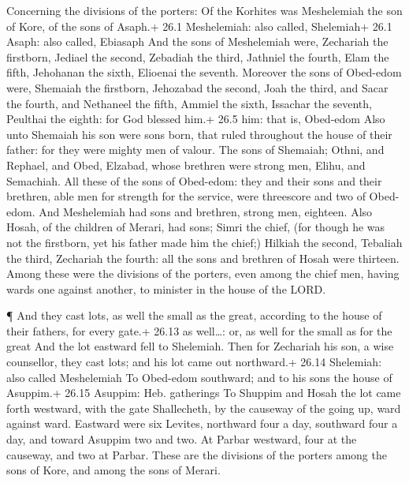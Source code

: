  Concerning the divisions of the porters: Of the Korhites
was Meshelemiah the son of Kore, of the sons of Asaph.+ 26.1
Meshelemiah: also called, Shelemiah+ 26.1 Asaph: also called, Ebiasaph
 And the sons of Meshelemiah were, Zechariah the firstborn,
Jediael the second, Zebadiah the third, Jathniel the fourth,
 Elam the fifth, Jehohanan the sixth, Elioenai the seventh.
 Moreover the sons of Obed-edom were, Shemaiah the
firstborn, Jehozabad the second, Joah the third, and Sacar the fourth,
and Nethaneel the fifth,  Ammiel the sixth, Issachar the
seventh, Peulthai the eighth: for God blessed him.+ 26.5 him: that is,
Obed-edom  Also unto Shemaiah his son were sons born, that
ruled throughout the house of their father: for they were mighty men of
valour.  The sons of Shemaiah; Othni, and Rephael, and Obed,
Elzabad, whose brethren were strong men, Elihu, and Semachiah.
 All these of the sons of Obed-edom: they and their sons and
their brethren, able men for strength for the service, were threescore
and two of Obed-edom.  And Meshelemiah had sons and
brethren, strong men, eighteen.  Also Hosah, of the
children of Merari, had sons; Simri the chief, (for though he was not
the firstborn, yet his father made him the chief;)  Hilkiah
the second, Tebaliah the third, Zechariah the fourth: all the sons and
brethren of Hosah were thirteen.  Among these were the
divisions of the porters, even among the chief men, having wards one
against another, to minister in the house of the LORD.

 ¶ And they cast lots, as well the small as the great,
according to the house of their fathers, for every gate.+ 26.13 as
well\ldots: or, as well for the small as for the great  And
the lot eastward fell to Shelemiah. Then for Zechariah his son, a wise
counsellor, they cast lots; and his lot came out northward.+ 26.14
Shelemiah: also called Meshelemiah  To Obed-edom southward;
and to his sons the house of Asuppim.+ 26.15 Asuppim: Heb. gatherings
 To Shuppim and Hosah the lot came forth westward, with the
gate Shallecheth, by the causeway of the going up, ward against ward.
 Eastward were six Levites, northward four a day, southward
four a day, and toward Asuppim two and two.  At Parbar
westward, four at the causeway, and two at Parbar.  These
are the divisions of the porters among the sons of Kore, and among the
sons of Merari.

